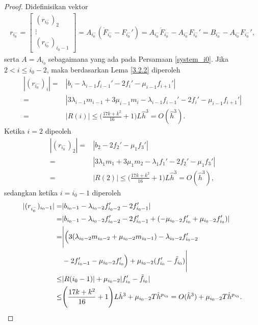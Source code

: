 \begin{proof}
    Didefinisikan vektor
    \begin{align*}
        r_{i_0^{-}}=
        \begin{bmatrix}
        (r_{i_0^{-}})_2\\
        \vdots\\
        (r_{i_0^{-}})_{i_0-1}
        \end{bmatrix}
        = A_{i_0^-}(\dot{F}_{i_0^-} - F_{i_0^-}') = A_{i_0^-}\dot{F}_{i_0^-} - A_{i_0^-}F_{i_0^-}' = B_{i_0^-} - A_{i_0^-}F_{i_0^-}',
    \end{align*}
    serta $A = A_{i_0}$ sebagaimana yang ada pada Persamaan \eqref{system_i0}.
    Jika $2 < i \leq i_0 - 2$, maka berdasarkan Lema \ref{3.2.2} diperoleh
    \begin{align*}
        |(r_{i_0^{-}})_i| =& |b_i - \lambda_{i-1}f_{i-1}' - 2f_i' - \mu_{i-1}f_{i+1}'|\\
        =&|3\lambda_{i-1}m_{i-1} + 3\mu_{i-1}m_{i} - \lambda_{i-1}f_{i-1}' - 2f_i' - \mu_{i-1}f_{i+1}'| \\
        =&|R(i)| \leq \Bigg( \frac{17k + k^2}{16} + 1 \Bigg) L\hat{h}^3 = O(\hat{h}^3).
    \end{align*}
    Ketika $i=2$ dipeoleh
    \begin{align*}
        |(r_{i_0^{-}})_2| =& |b_2 - 2f_2' - \mu_{1}f_{3}'|\\
        =&|3\lambda_{1}m_{1} + 3\mu_{1}m_{2} - \lambda_1f_1' - 2f_2' - \mu_{1}f_{3}'| \\
        =&|R(2)| \leq \Bigg( \frac{17k + k^2}{16} + 1 \Bigg) L\hat{h}^3 = O(\hat{h}^3),
    \end{align*}
    sedangkan ketika $i = i_0 - 1$ diperoleh
    \begin{align*}
        |(r_{i_0^{-}})_{i_0 - 1}| =& |b_{i_0-1} - \lambda_{i_0-2}f_{i_0-2}' - 2f_{i_0-1}'| \\
        =& |b_{i_0-1} - \lambda_{i_0-2}f_{i_0-2}' - 2f_{i_0-1}' + (-\mu_{i_0-2}f_{i_0}' + \mu_{i_0-2}f_{i_0}')|\\
        =&\Bigg| \Big( 3(\lambda_{i_0-2}m_{i_0-2} + \mu_{i_0-2}m_{i_0 - 1}) - \lambda_{i_0-2}f_{i_0-2}'  \\
        &- 2f_{i_0 - 1}'- \mu_{i_0 - 2}f_{i_0}' \Big) + \mu_{i_0 - 2}(f_{i_0}' - \Tilde{f}_{i_0})\Bigg| \\
        \leq&|R(i_0 - 1)| + \mu_{i_0-2}|f_{i_0}' - \Tilde{f}_{i_0}| \\
        \leq&\Bigg( \frac{17k + k^2}{16} + 1 \Bigg)L\hat{h}^3 + \mu_{i_0 - 2} T \hat{h}^{p_{i_0}} = O(\hat{h}^3) + \mu_{i_0 - 2} T \hat{h}^{p_{i_0}}.
    \end{align*}


\end{proof}
